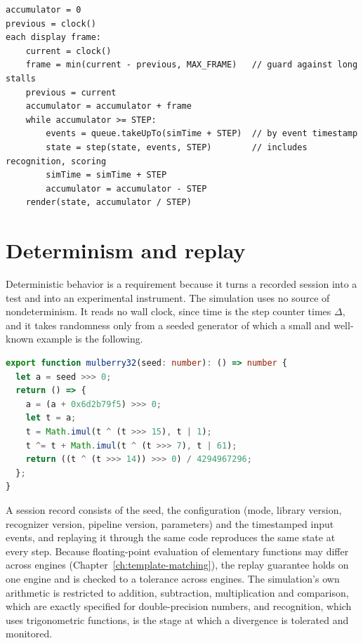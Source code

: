 \begin{lstlisting}[language=Pseudo,caption={The main loop (pseudocode).},label={lst:loop}]
accumulator = 0
previous = clock()
each display frame:
    current = clock()
    frame = min(current - previous, MAX_FRAME)   // guard against long stalls
    previous = current
    accumulator = accumulator + frame
    while accumulator >= STEP:
        events = queue.takeUpTo(simTime + STEP)  // by event timestamp
        state = step(state, events, STEP)        // includes recognition, scoring
        simTime = simTime + STEP
        accumulator = accumulator - STEP
    render(state, accumulator / STEP)
\end{lstlisting}

\section{Determinism and replay}

Deterministic behavior is a requirement because it turns a recorded session into a test and into an experimental instrument. The simulation uses no source of nondeterminism. It reads no wall clock, since time is the step counter times $\Delta$, and it takes randomness only from a seeded generator of which a small and well-known example is the following.

\begin{lstlisting}[language=TypeScript,caption={A small seeded generator (mulberry32).},label={lst:prng}]
export function mulberry32(seed: number): () => number {
  let a = seed >>> 0;
  return () => {
    a = (a + 0x6d2b79f5) >>> 0;
    let t = a;
    t = Math.imul(t ^ (t >>> 15), t | 1);
    t ^= t + Math.imul(t ^ (t >>> 7), t | 61);
    return ((t ^ (t >>> 14)) >>> 0) / 4294967296;
  };
}
\end{lstlisting}

A session record consists of the seed, the configuration (mode, library version, recognizer version, pipeline version, parameters) and the timestamped input events, and replaying it through the same code reproduces the same state at every step. Because floating-point evaluation of elementary functions may differ across engines (Chapter~\ref{ch:template-matching}), the replay guarantee holds on one engine and is checked to a tolerance across engines. The simulation's own arithmetic is restricted to addition, subtraction, multiplication and comparison, which are exactly specified for double-precision numbers, and recognition, which uses trigonometric functions, is the stage at which a divergence is tolerated and monitored.

